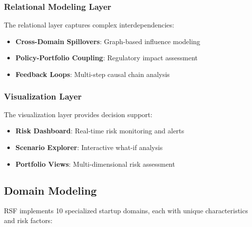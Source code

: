 \documentclass[conference]{IEEEtran}
\begin{document}
\subsubsection{Relational Modeling Layer}
The relational layer captures complex interdependencies:
\begin{itemize}
    \item \textbf{Cross-Domain Spillovers}: Graph-based influence modeling
    \item \textbf{Policy-Portfolio Coupling}: Regulatory impact assessment
    \item \textbf{Feedback Loops}: Multi-step causal chain analysis
\end{itemize}

\subsubsection{Visualization Layer}
The visualization layer provides decision support:
\begin{itemize}
    \item \textbf{Risk Dashboard}: Real-time risk monitoring and alerts
    \item \textbf{Scenario Explorer}: Interactive what-if analysis
    \item \textbf{Portfolio Views}: Multi-dimensional risk assessment
\end{itemize}

\subsection{Domain Modeling}

RSF implements 10 specialized startup domains, each with unique characteristics and risk factors:
\end{document}
